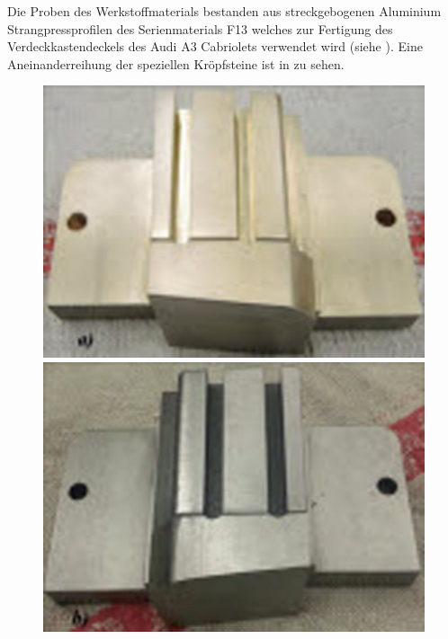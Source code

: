 \documentclass[12pt,a4paper,parskip]{scrartcl}
\begin{document}
Die Proben des Werkstoffmaterials bestanden aus streckgebogenen Aluminium Strangpressprofilen des Serienmaterials F13 welches zur Fertigung des Verdeckkastendeckels des Audi A3 Cabriolets verwendet wird  (siehe ). Eine Aneinanderreihung der speziellen Kröpfsteine ist in  zu sehen.
  



\begin{figure}[H]
\centering
\begin{minipage}[t]{0.3\textwidth}
\includegraphics[width=.9\textwidth]{diebronze}
\end{minipage}
\begin{minipage}[t]{0.3\textwidth}
\includegraphics[width=.9\textwidth]{diestahl}
\end{minipage}
\begin{minipage} [t]{0.3115\textwidth}

\end{minipage}
\end{figure}
\end{document}
